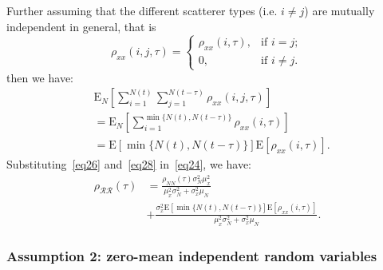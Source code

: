 \documentclass[journal]{IEEEtran}
\begin{document}
Further assuming that the different scatterer types (i.e. $i \neq j$) are mutually independent in general, that is
\begin{equation}
\rho_{x x}(i, j, \tau) = \begin{cases}
\rho_{x x}(i, \tau), & \text{if } i = j; \\
0, & \text{if } i \neq j.
\label{eq27}
\end{cases}
\end{equation}
then we have:
\begin{equation}
\begin{split}
& \mathrm{E}_{N}\left[\sum_{i=1}^{N(t)} \sum_{j=1}^{N(t-\tau)} \rho_{x x}(i, j, \tau)\right] \\
& = \mathrm{E}_{N}\left[\sum_{i=1}^{\min \{N(t), N(t-\tau)\}} \rho_{x x}(i, \tau)\right] \\
& = \mathrm{E}[\min \{N(t), N(t-\tau)\}] \mathrm{E}\left[\rho_{x x}(i, \tau)\right].
\label{eq28}
\end{split}
\end{equation}
Substituting~\eqref{eq26} and~\eqref{eq28} in~\eqref{eq24}, we have:
\begin{align}
\rho_{\mathcal{R} \mathcal{R}}(\tau) & = \frac{\rho_{N N}(\tau) \sigma_{N}^{2} \mu_{x}^{2}}{\mu_{x}^{2} \sigma_{N}^{2}+\sigma_{x}^{2} \mu_{N}} \nonumber\\
& + \frac{\sigma_{x}^{2} \mathrm{E}[\min \{N(t), N(t-\tau)\}] \mathrm{E}\left[\rho_{x x}(i, \tau)\right]}{\mu_{x}^{2} \sigma_{N}^{2}+\sigma_{x}^{2} \mu_{N}}.
\label{eq29}
\end{align}

\subsubsection{Assumption 2: zero-mean independent random variables}
\end{document}
